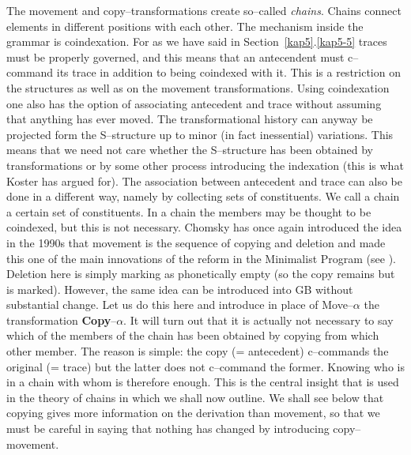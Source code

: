 The movement and copy--transformations create so--called {\it chains}.
Chains connect elements in different positions with each other. The
mechanism inside the grammar is coindexation. For as we have said
in Section~\ref{kap5}.\ref{kap5-5} traces must be properly governed, and
this means that an antecendent must c--com\-mand its trace in addition to
being coindexed with it. This is a restriction on the structures
as well as on the movement transformations. Using coindexation
one also has the option of associating antecedent and trace
without assuming that anything has ever moved. The transformational
history can anyway be projected form the S--structure up to minor
(in fact inessential) variations. This means that we need not
care whether the S--structure has been obtained by transformations
or by some other process introducing the indexation (this is what
Koster has argued for). The association between antecedent and
trace can also be done in a different way, namely by collecting
sets of constituents. We call a chain a certain set of constituents.
In a chain the members may be thought to be coindexed, but this is 
not necessary. Chomsky 
has once again
introduced the idea in the 1990s that movement is the sequence of
copying and deletion and made this one of the main innovations of
the reform in the Minimalist Program (see \cite{chomsky:minimalist}).
Deletion here is simply marking as phonetically empty (so the
copy remains but is marked). However, the same idea can be
introduced into GB without substantial change. Let us do this
here and introduce in place of Move--$\alpha$ the transformation
\textbf{Copy}--$\alpha$. It will turn out that it is actually not
necessary to say which of the members of the chain has been obtained
by copying from which other member. The reason is simple:
the copy (= antecedent) c--commands the original (= trace) but
the latter does not c--command the former. Knowing who is in a 
chain with whom is therefore enough. This is the central insight
that is used in the theory of chains in \cite{kracht:chains}
which we shall now outline.  We shall see below that copying
gives more information on the derivation than movement, so that
we must be careful in saying that nothing has changed by introducing
copy--movement.

